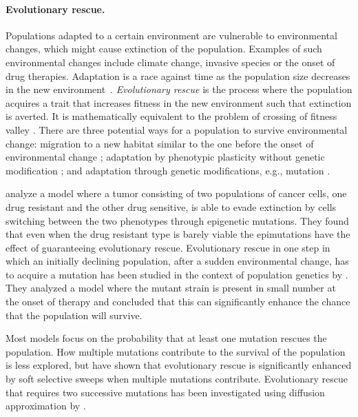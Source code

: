 \documentclass[12pt]{extarticle}
\begin{document}
\paragraph{Evolutionary rescue.} Populations adapted to a certain environment are vulnerable to environmental changes, which might cause extinction of the population. Examples of such environmental changes include climate change, invasive species or the onset of drug therapies. Adaptation is a race against time as the population size decreases in the new environment~\citep{tanaka2022surviving}. 
\emph{Evolutionary rescue} is the process where the population acquires a trait that increases fitness in the new environment such that extinction is averted. It is mathematically equivalent to the problem of crossing of fitness valley \citep{weissman2009rate,weissman2010rate}.
There are three potential ways for a population to survive environmental change: migration to a new habitat similar to the one before the onset of environmental change \citep{harsch2014keeping,cobbold2020should,zhou2022range}; adaptation by phenotypic plasticity without genetic modification \citep{carja2019evolutionary,carja2017evolutionary,levien2021non,gunnarsson2020understanding}; and adaptation through genetic modifications, e.g., mutation \citep{gomulkiewicz1995does,uecker2014evolutionary,uecker2016role,uecker2011fixation,orr2014population}.

\citet{gunnarsson2020understanding} analyze a model where a tumor consisting of two populations of cancer cells, one drug resistant and the other drug sensitive, is able to evade extinction by cells switching between the two phenotypes through epigenetic mutations. They found that even when the drug resistant type is barely viable the epimutations have the effect of guaranteeing evolutionary rescue. Evolutionary rescue in one step in which an initially declining population, after a sudden environmental change, has to acquire a mutation has been studied in the context of population genetics  by \citep{orr2008population,orr2014population}. They analyzed a model where the mutant strain is present in small number at the onset of therapy and concluded that this can significantly enhance the chance that the population will survive. 

Most models focus on the probability that at least one mutation rescues the population. How multiple mutations contribute to the survival of the population is less explored, but \citet{wilson2017soft} have shown that evolutionary rescue is significantly enhanced by soft selective sweeps when multiple mutations contribute.  Evolutionary rescue that requires two successive mutations has been investigated using diffusion approximation by \citet{martin2013probability}.
\end{document}
